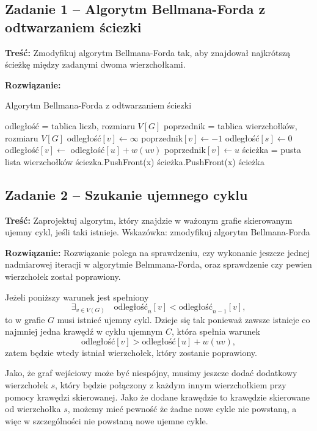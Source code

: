 \subsection{Zadanie 1 -- Algorytm Bellmana-Forda z odtwarzaniem ściezki}
\textbf{Treść: }Zmodyfikuj algorytm Bellmana-Forda tak, 
aby znajdował najkrótszą ścieżkę między zadanymi dwoma
wierzchołkami.

\textbf{Rozwiązanie: }

\begin{algorithm}[H]
	\caption{Algorytm Bellmana-Forda z odtwarzaniem ściezki}
	\begin{algorithmic}[1]
		\State odległość = tablica liczb, rozmiaru $V[G]$
		\State poprzednik = tablica wierzchołków, rozmiaru $V[G]$
		\State odległość$[v]\gets\infty$
		\State poprzednik$[v]\gets-1$
		\EndFor
		\State odległość$[s]\gets0$
		\State odległość$[v]\gets$ odległość$[u] + w(uv)$ 
		\State poprzednik$[v]\gets u$
		\EndIf
		\EndFor
		\EndFor
		\State ścieżka = pusta lista wierzchołków
		\State ściezka.PushFront(x)
		\State ścieżka.PushFront(x)
		\EndWhile
		\State \Return ścieżka
		\EndProcedure
	\end{algorithmic}
	\label{Zadanie31}
\end{algorithm}
\subsection{Zadanie 2 -- Szukanie ujemnego cyklu}
\textbf{Treść: } Zaprojektuj algorytm, który znajdzie w 
ważonym grafie skierowanym ujemny cykl, jeśli taki istnieje.
Wskazówka: zmodyfikuj algorytm Bellmana-Forda

\textbf{Rozwiązanie: }
Rozwiązanie polega na sprawdzeniu, czy wykonanie
jeszcze jednej nadmiarowej iteracji 
w algorytmie Belmmana-Forda, oraz sprawdzenie
czy pewien wierzchołek został poprawiony.

Jeżeli poniższy warunek jest spełniony
\[\exists_{v\in V(G)}\quad \text{odległość}_n[v] < \text{odległość}_{n-1}[v],\]
to w grafie $G$ musi istnieć ujemny cykl. Dzieje się 
tak ponieważ zawsze istnieje co najmniej jedna krawędź 
w cyklu ujemnym $C$, która spełnia warunek 
\[\text{odległość}[v] > \text{odległość}[u] + w(uv),\]
zatem będzie wtedy istniał wierzchołek, który zostanie 
poprawiony.

Jako, że graf wejściowy może być niespójny,
musimy jeszcze dodać dodatkowy wierzchołek $s$, który
będzie połączony z każdym innym wierzchołkiem
przy pomocy krawędzi skierowanej. Jako
że dodane krawędzie to krawędzie skierowane
od wierzchołka $s$, możemy mieć pewność
że żadne nowe cykle nie powstaną, a więc
w szczególności nie powstaną nowe
ujemne cykle.

